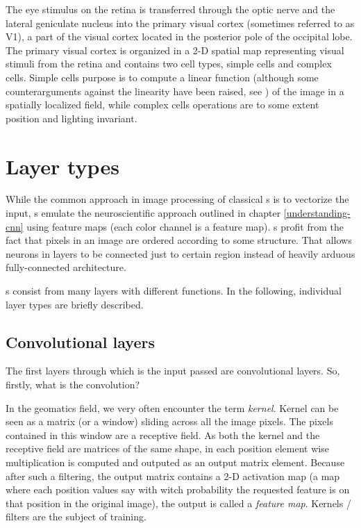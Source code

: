 The eye stimulus on the retina is transferred through the optic nerve and the 
lateral geniculate nucleus into the primary visual cortex (sometimes referred to 
as V1), a part of the visual cortex located in the posterior pole of the 
occipital lobe. The primary visual cortex is organized in a 2-D spatial map 
representing visual stimuli from the retina and contains two cell types, simple 
cells and complex cells. Simple cells purpose is to compute a linear function 
(although some counterarguments against the linearity have been raised, see 
\cite{simple-cells}) of the image in a spatially localized field, while complex 
cells operations are to some extent position and lighting invariant. 

\section{Layer types}
\label{layers}

While the common approach in image processing of classical s is to 
vectorize the input, s emulate the neuroscientific approach outlined in 
chapter \ref{understanding-cnn} using feature maps (each color channel is a 
feature map). s profit from the fact that pixels in an image are ordered 
according to some structure. That allows neurons in layers to be connected just 
to certain region instead of heavily arduous fully-connected architecture. 

s consist from many layers with different functions. In the following, 
individual layer types are briefly described. 

\subsection{Convolutional layers}
\label{conv-layers}

The first layers through which is the input passed are convolutional layers. So, 
firstly, what is the convolution? 

In the geomatics field, we very often encounter the term \textit{kernel}. Kernel 
can be seen as a matrix (or a window) sliding across all the image pixels. The 
pixels contained in this window are a receptive field. As both the kernel and 
the receptive field are matrices of the same shape, in each position element 
wise multiplication is computed and outputed as an output matrix element. 
Because after such a filtering, the output matrix contains a 2-D activation map 
(a map where each position values say with witch probability the requested 
feature is on that position in the original image), the output is called a 
\textit{feature map}. Kernels / filters are the subject of training. 

